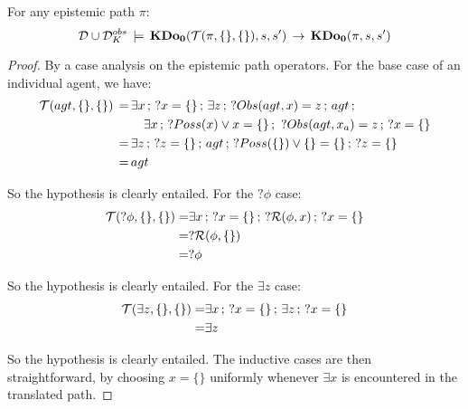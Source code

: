 \begin{lemma}
\label{lem:KDoZ_E1_impl_KDoZ}For any epistemic path $\pi$:\[
\mathcal{D}\cup\mathcal{D}_{K}^{obs}\,\models\,\mathbf{KDo_{0}}(\mathcal{T}(\pi,\{\},\{\}),s,s')\,\rightarrow\,\mathbf{KDo_{0}}(\pi,s,s')\]

\end{lemma}
\begin{proof}
By a case analysis on the epistemic path operators. For the base case
of an individual agent, we have:\begin{align*}
\mathcal{T}(agt,\{\},\{\})\,=\, & \exists x\,;\,?x=\{\}\,;\,\exists z\,;\,?Obs(agt,x)=z\,;\, agt\,;\\
 & \,\,\,\,\,\,\exists x\,;\,?Poss(x)\vee x=\{\}\,;\,\,?Obs(agt,x_{a})=z\,;\,?x=\{\}\\
=\, & \exists z\,;\,?z=\{\}\,;\, agt\,;\,?Poss(\{\})\vee\{\}=\{\}\,;\,?z=\{\}\\
=\, & agt\end{align*}


So the hypothesis is clearly entailed. For the $?\phi$ case:\begin{align*}
\mathcal{T}(?\phi,\{\},\{\})= & \exists x\,;\,?x=\{\}\,;\,?\mathcal{R}(\phi,x)\,;\,?x=\{\}\\
= & ?\mathcal{R}(\phi,\{\})\\
= & ?\phi\end{align*}


So the hypothesis is clearly entailed. For the $\exists z$ case:\begin{align*}
\mathcal{T}(\exists z,\{\},\{\})= & \exists x\,;\,?x=\{\}\,;\,\exists z\,;\,?x=\{\}\\
= & \exists z\end{align*}


So the hypothesis is clearly entailed. The inductive cases are then
straightforward, by choosing $x=\{\}$ uniformly whenever $\exists x$
is encountered in the translated path. 
\end{proof}
\medskip{}


